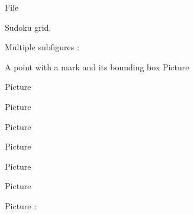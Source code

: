File 
\begin{center}
   
\end{center}
   

Sudoku grid.

\begin{center}
   
\end{center}
   

   \clearpage

Multiple subfigures :

A point with a mark and its bounding box
Picture 
\Huge
\begin{center}
   
\end{center}
\normalsize


Picture 
\begin{center}
   
\end{center}
   

Picture 
\begin{center}
   
\end{center}



Picture 
\begin{center}

\end{center}


Picture 
\begin{center}
   
\end{center}


Picture 
\begin{center}
   
\end{center}


Picture 
\begin{center}
   
\end{center}


Picture : 
\begin{center}
   
\end{center}
   


